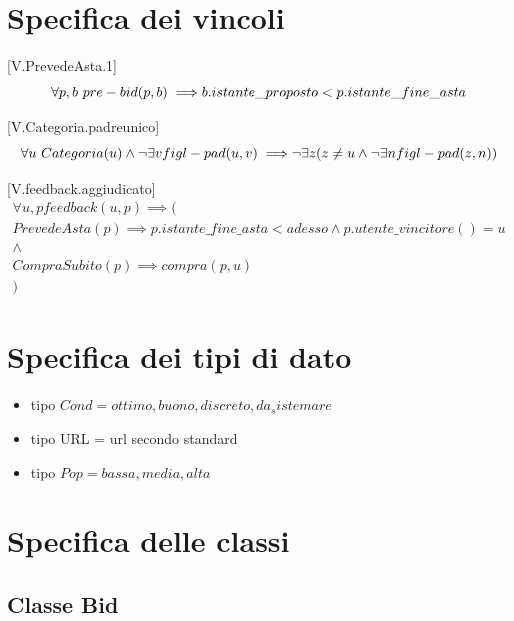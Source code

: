 \documentclass{article}
\begin{document}
\section{Specifica dei vincoli}

    [V.PrevedeAsta.1]
    \[
        \forall p,b \text{ } pre-bid(p,b) \implies \\
            b.istante\_proposto < p.istante\_fine\_asta
    \]

    [V.Categoria.padreunico]
    \[
        \forall u \text{ } Categoria(u) \land \neg\exists v figl-pad(u,v) \implies \\
            \neg\exists z( z\not = u \land \neg\exists n figl-pad(z,n) )
    \]

    [V.feedback.aggiudicato]
    \begin{equation}
        \begin{gathered}
            \forall u,p feedback(u,p) \implies (\\
                PrevedeAsta(p) \implies p.istante\_fine\_asta < adesso \land p.utente\_vincitore() = u\\
                    \land\\
                CompraSubito(p) \implies compra(p,u)\\
            )
        \end{gathered}
    \end{equation}

\section{Specifica dei tipi di dato}
\begin{itemize}
 
\item tipo $Cond = {ottimo, buono, discreto, da_sistemare}$

\item tipo URL = url secondo standard

\item tipo $Pop = {bassa, media, alta}$

\end{itemize}

\section{Specifica delle classi}

\subsection{Classe Bid}
\end{document}
